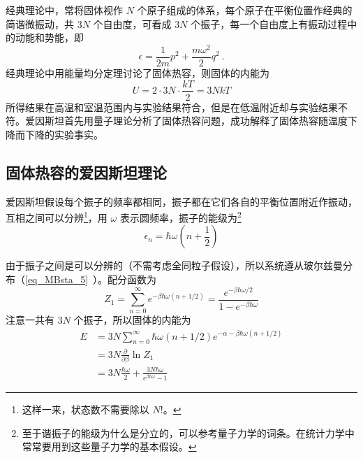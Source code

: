 

经典理论中，常将固体视作 $N$ 个原子组成的体系，每个原子在平衡位置作经典的简谐微振动，共 $3N$ 个自由度，可看成 $3N$ 个振子，每一个自由度上有振动过程中的动能和势能，即
\begin{equation}
\epsilon=\frac{1}{2m}p^2+\frac{m\omega^2}{2}q^2~.
\end{equation}
经典理论中用能量均分定理讨论了固体热容，则固体的内能为
\begin{equation}
U=2\cdot 3N\cdot \frac{kT}{2}=3NkT
\end{equation}
所得结果在高温和室温范围内与实验结果符合，但是在低温附近却与实验结果不符。爱因斯坦首先用量子理论分析了固体热容问题，成功解释了固体热容随温度下降而下降的实验事实。

\subsection{固体热容的爱因斯坦理论}
爱因斯坦假设每个振子的频率都相同，振子都在它们各自的平衡位置附近作振动，互相之间可以分辨\footnote{这样一来，状态数不需要除以 $N!$。}，用 $\omega$ 表示圆频率，振子的能级为\footnote{至于谐振子的能级为什么是分立的，可以参考量子力学的词条。在统计力学中常常要用到这些量子力学的基本假设。}
\begin{equation}
\epsilon_n=\hbar \omega\left(n+\frac{1}{2}\right)
\end{equation}

由于振子之间是可以分辨的（不需考虑全同粒子假设），所以系统遵从玻尔兹曼分布（\autoref{eq_MBsta_5}~）。配分函数为
\begin{equation}
Z_1=\sum_{n=0}^\infty e^{-\beta \hbar \omega(n+1/2)}=\frac{e^{-\beta\hbar \omega/2}}{1-e^{-\beta\hbar\omega}}
\end{equation}
注意一共有 $3N$ 个振子，所以固体的内能为
\begin{equation}\label{eq_EScap_1}
\begin{aligned}
E&=3N\sum_{n=0}^\infty \hbar\omega(n+1/2)e^{-\alpha-\beta\hbar\omega(n+1/2)}\\
&=3N\frac{\partial }{\partial \beta}\ln Z_1\\
&=3N\frac{\hbar \omega}{2}+\frac{3N\hbar \omega}{e^{\beta\hbar\omega}-1}
\end{aligned}
\end{equation}

